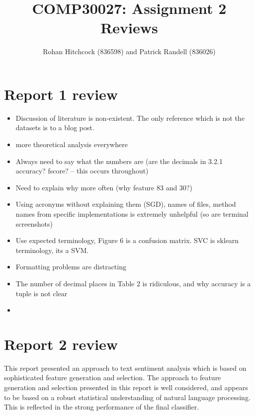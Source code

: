 \documentclass[11pt]{article}
\begin{document}
\title{\textbf{COMP30027: Assignment 2 Reviews}}
\author{Rohan Hitchcock (836598) and Patrick Randell (836026)}
\date{}
\maketitle

\section*{Report 1 review}

\begin{itemize}
    \item Discussion of literature is non-existent. The only reference which is not the datasets is to a blog post.
    \item more theoretical analysis everywhere 
    \item Always need to say what the numbers are (are the decimals in 3.2.1 accuracy? fscore? -- this occurs throughout)
    \item Need to explain why more often (why feature 83 and 30?)
    \item Using acronyms without explaining them (SGD), names of files, method names from specific implementations is extremely unhelpful (so are terminal screenshots)
    \item Use expected terminology, Figure 6 is a confusion matrix. SVC is sklearn terminology, its a SVM.
    \item Formatting problems are distracting 
    \item The number of decimal places in Table 2 is ridiculous, and why accuracy is a tuple is not clear
    \item 
\end{itemize}

\section*{Report 2 review}
This report presented an approach to text sentiment analysis which is based on sophisticated feature generation and selection. The approach to feature generation and selection presented in this report is well considered, and appears to be based on a robust statistical understanding of natural language processing. This is reflected in the strong performance of the final classifier. 
\end{document}
